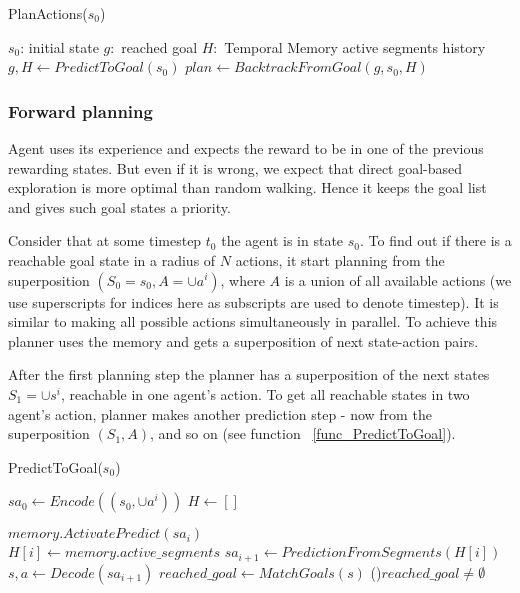\documentclass[runningheads]{llncs}
\begin{document}
\begin{function}
  \caption{PlanActions($s_0$)}\label{func_PlanActions}
  \SetAlgoNoLine
  $s_0$: initial state \;
  $g: $ reached goal \;
  $H: $ Temporal Memory active segments history \;
  \quad \\

  $g, H \leftarrow PredictToGoal(s_0)$ \;
  $plan \leftarrow BacktrackFromGoal(g, s_0, H)$ \;

\end{function}

\subsubsection{Forward planning}

Agent uses its experience and expects the reward to be in one of the previous rewarding states. But even if it is wrong, we expect that direct goal-based exploration is more optimal than random walking. Hence it keeps the goal list and gives such goal states a priority.

Consider that at some timestep $t_0$ the agent is in state $s_0$. To find out if there is a reachable goal state in a radius of $N$ actions, it start planning from the superposition $(S_0 = s_0, A = \cup a^i)$, where $A$ is a union of all available actions (we use superscripts for indices here as subscripts are used to denote timestep). It is similar to making all possible actions simultaneously in parallel. To achieve this planner uses the memory and gets a superposition of next state-action pairs.

After the first planning step the planner has a superposition of the next states $S_1 = \cup s^i$, reachable in one agent's action. To get all reachable states in two agent's action, planner makes another prediction step - now from the superposition $(S_1, A)$, and so on (see function ~\ref{func_PredictToGoal}).

\begin{function}
  \caption{PredictToGoal($s_0$)} \label{func_PredictToGoal}
  \SetNoFillComment

  $sa_0 \leftarrow Encode((s_0, \cup a^i))$ 
  $H \leftarrow []$ 

   {
    $memory.ActivatePredict(sa_i)$ \;
    \quad \\

    $H[i] \leftarrow memory.active\_segments$ \;
    $sa_{i+1} \leftarrow PredictionFromSegments(H[i])$ \;
    \quad \\
    
    $s, a \leftarrow Decode(sa_{i+1})$ 
    $reached\_goal \leftarrow MatchGoals(s)$ \;
    \If(){$reached\_goal \neq \emptyset$} {
       \;
    }{}
  }
  \Return{$\emptyset$}
\end{function}
\end{document}

